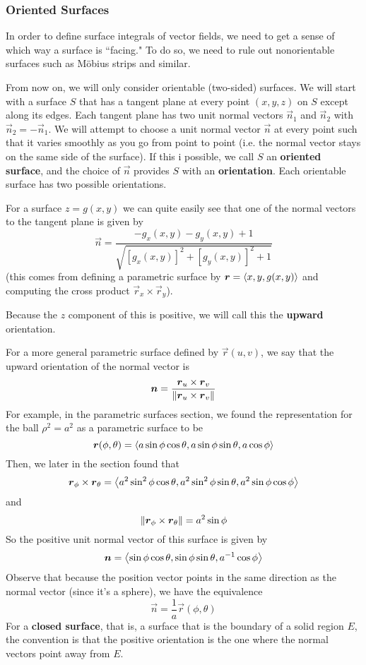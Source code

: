\subsubsection{Oriented Surfaces}
In order to define surface integrals of vector fields, we need to get a sense of which way a surface is ``facing." To do so, we need to rule out nonorientable surfaces such as Möbius strips and similar. \par
From now on, we will only consider orientable (two-sided) surfaces. We will start with a surface $S$ that has a tangent plane at every point $(x,y,z)$ on $S$ except along its edges. Each tangent plane has two unit normal vectors $\vec n_1$ and $\vec n_2$ with $\vec n_2 = -\vec n_1$. We will attempt to choose a unit normal vector $\vec n$ at every point such that it varies smoothly as you go from point to point (i.e. the normal vector stays on the same side of the surface). If this i possible, we call $S$ an \textbf{oriented surface}, and the choice of $\vec n$ provides $S$ with an \textbf{orientation}. Each orientable surface has two possible orientations. \par
For a surface $z = g(x,y)$ we can quite easily see that one of the normal vectors to the tangent plane is given by
\[ \vec n = \frac{-g_x(x,y) - g_y(x,y) + 1}{\sqrt{[g_x(x,y)]^2+[g_y(x,y)]^2+1}}\]
(this comes from defining a parametric surface by $\boldsymbol{r} = \left\langle x,y,g(x,y)\right\rangle$ and computing the cross product $\vec r_x \times \vec r_y$). \par
Because the $z$ component of this is positive, we will call this the \textbf{upward} orientation. \par
For a more general parametric surface defined by $\vec r(u,v)$, we say that the upward orientation of the normal vector is
\[ \boldsymbol{n} = \frac{\boldsymbol{r}_u \times \boldsymbol{r}_v}{\norm{\boldsymbol{r}_u\times \boldsymbol{r}_v}}\]
For example, in the parametric surfaces section, we found the representation for the ball $\rho^2 = a^2$ as a parametric surface to be
\[ \boldsymbol{r}(\phi, \theta) = \left\langle a\sin\phi\cos\theta, a\sin\phi\sin\theta, a\cos\phi\right\rangle \]
Then, we later in the section found that
\[ \boldsymbol{r}_\phi\times \boldsymbol{r}_{\theta} = \left\langle a^2\sin^2\phi\cos\theta, a^2\sin^2\phi\sin\theta, a^2\sin\phi\cos\phi \right\rangle \]
and
\[ \norm{\boldsymbol{r}_\phi \times \boldsymbol{r}_\theta} = a^2\sin\phi \]
So the positive unit normal vector of this surface is given by
\[ \boldsymbol{n} = \left\langle \sin\phi\cos\theta, \sin\phi\sin\theta, a^{-1}\cos\phi\right\rangle\]
Observe that because the position vector points in the same direction as the normal vector (since it's a sphere), we have the equivalence
\[ \vec n = \frac{1}{a}\vec r(\phi, \theta)\]
For a \textbf{closed surface}, that is, a surface that is the boundary of a solid region $E$, the convention is that the positive orientation is the one where the normal vectors point away from $E$.
